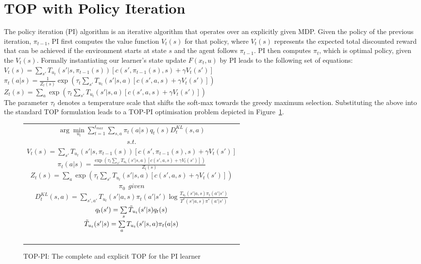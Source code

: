 \documentclass[letterpaper]{aamas2010}
\begin{document}
\section{TOP with Policy Iteration}\label{sec: TOP-PI}
The policy iteration (PI) algorithm is an iterative 
algorithm that operates over an explicitly given MDP. Given the policy
of the previous iteration, $\pi_{t-1}$, PI first computes 
the value function $V_t(s)$ for that policy, where  $V_t(s)$ represents
the expected total discounted reward that can be achieved if the
environment starts at state $s$ and the agent follows $\pi_{t-1}$.
PI then computes $\pi_{t}$, which is optimal policy, given the $V_t(s)$.
Formally instantiating our
learner's state update $F(x_t,u)$ by PI leads to the following set of
equations:
{\center 
$V_t(s)=\sum\limits_{s'}T_{u_t}(s'|s,\pi_{t-1}(s))\left[
c(s',\pi_{t-1}(s),s)+\gamma V_t(s')
\right]$\\
$\pi_t(a|s)=\frac{1}{Z_t(s)}\exp\left(\tau_t\sum\limits_{s'}T_{u_t}(s'|s,a)\left[
c(s',a,s)+\gamma V_t(s')
\right]\right)$\\
$Z_t(s)=\sum\limits_a\exp\left(\tau_t\sum\limits_{s'}T_{u_t}(s'|s,a)\left[
c(s',a,s)+\gamma V_t(s')
\right]\right)$\\
}
The parameter $\tau_t$ denotes a temperature scale that
shifts the soft-max towards the greedy maximum selection. Substituting
the above into the standard TOP formulation leads to a TOP-PI
optimisation problem depicted in Figure~\ref{t_opt_PI}.
\begin{figure}[th]
\begin{tabular}{|c|} \hline \parbox{3.2 in} {\center 
$\arg\min\limits_{u_t}\sum\limits_{t=1}^{t_{max}}\sum\limits_{s,a}\pi_t(a|s)q_t(s)D^{KL}_t(s,a)$\\
$s.t.$\\
$V_t(s)=\sum\limits_{s'}T_{u_t}(s'|s,\pi_{t-1}(s))\left[
c(s',\pi_{t-1}(s),s)+\gamma V_t(s')
\right]$\\
$\pi_t(a|s)=\frac{\exp\left(\tau_t\sum\limits_{s'}T_{u_t}(s'|s,a)\left[
c(s',a,s)+\gamma V_t(s')
\right]\right)}{Z_t(s)}$\\
$Z_t(s)=\sum\limits_a\exp\left(\tau_t\sum\limits_{s'}T_{u_t}(s'|s,a)\left[
c(s',a,s)+\gamma V_t(s')
\right]\right)$\\
$\pi_0\ \ \displaystyle{given}$\\
$D^{KL}_t(s,a)=\sum\limits_{s',a'}T_{u_t}(s'|a,s)\pi_t(a'|s')\log\frac{T_{u_t}(s'|a,s)\pi_t(a'|s')}{T^*(s'|a,s)\pi^*(a'|s')}$\\
$q_t(s')=\sum\limits_s\Tilde{T}_{u_t}(s'|s)q_t(s)$\\
$\Tilde{T}_{u_t}(s'|s)=\sum\limits_aT_{u_t}(s'|s,a)\pi_t(a|s)$\\\ \\
}\\ \hline \end{tabular}
\caption{\label{t_opt_PI}TOP-PI: The complete and explicit TOP for the
  PI learner}
\end{figure}
\end{document}
